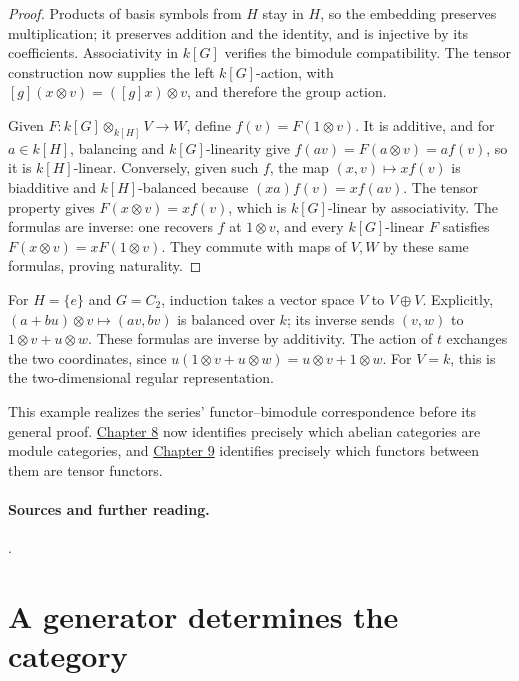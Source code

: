 \documentclass[11pt,a4paper]{article}
\theoremstyle{plain}
\theoremstyle{definition}
\begin{document}
\begin{proof}

Products of basis symbols from \(H\) stay in \(H\), so the embedding preserves multiplication; it preserves addition and the identity, and is injective by its coefficients. Associativity in \(k[G]\) verifies the bimodule compatibility. The tensor construction now supplies the left \(k[G]\)-action, with \([g](x\otimes v)=([g]x)\otimes v\), and therefore the group action.


Given \(F:k[G]\otimes_{k[H]}V\to W\), define \(f(v)=F(1\otimes v)\). It is additive, and for \(a\in k[H]\), balancing and \(k[G]\)-linearity give \(f(av)=F(a\otimes v)=af(v)\), so it is \(k[H]\)-linear. Conversely, given such \(f\), the map \((x,v)\mapsto xf(v)\) is biadditive and \(k[H]\)-balanced because \((xa)f(v)=x f(av)\). The tensor property gives \(F(x\otimes v)=xf(v)\), which is \(k[G]\)-linear by associativity. The formulas are inverse: one recovers \(f\) at \(1\otimes v\), and every \(k[G]\)-linear \(F\) satisfies \(F(x\otimes v)=xF(1\otimes v)\). They commute with maps of \(V,W\) by these same formulas, proving naturality.


\end{proof}
 
For \(H=\{e\}\) and \(G=C_2\), induction takes a vector space \(V\) to \(V\oplus V\). Explicitly, \((a+bu)\otimes v\mapsto(av,bv)\) is balanced over \(k\); its inverse sends \((v,w)\) to \(1\otimes v+u\otimes w\). These formulas are inverse by additivity. The action of \(t\) exchanges the two coordinates, since \(u(1\otimes v+u\otimes w)=u\otimes v+1\otimes w\). For \(V=k\), this is the two-dimensional regular representation.

 
This example realizes the series' functor--bimodule correspondence before its general proof. \hyperref[chapter-08]{Chapter 8} now identifies precisely which abelian categories are module categories, and \hyperref[chapter-09]{Chapter 9} identifies precisely which functors between them are tensor functors.

 
\paragraph{Sources and further reading.}
\cite[\S2.12]{crawley}.

\section{A generator determines the category}
\label{chapter-08}
  
\end{document}
